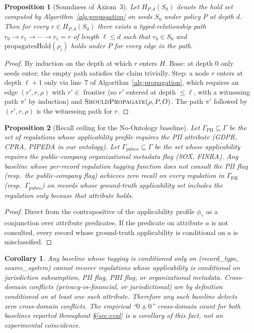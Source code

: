 \documentclass{ieeeaccess}
\newtheorem{proposition}{Proposition}
\newtheorem{corollary}{Corollary}
\begin{document}
\begin{proposition}[Soundness of Axiom~3]
Let $H_{P,d}(S_0)$ denote the hold set computed by Algorithm~\ref{alg:propagation} on seeds $S_0$ under policy $P$ at depth $d$. Then for every $r \in H_{P,d}(S_0)$ there exists a typed-relationship path $r_0 \to r_1 \to \cdots \to r_\ell = r$ of length $\ell \leq d$ such that $r_0 \in S_0$ and $\mathrm{propagatesHold}(\rho_i)$ holds under $P$ for every edge in the path.
\end{proposition}

\begin{proof}
By induction on the depth at which $r$ enters $H$. Base: at depth 0 only seeds enter; the empty path satisfies the claim trivially. Step: a node $r$ enters at depth $\ell + 1$ only via line~7 of Algorithm~\ref{alg:propagation}, which requires an edge $(r', r, \rho)$ with $r' \in$ frontier (so $r'$ entered at depth $\leq \ell$, with a witnessing path $\pi'$ by induction) and $\textsc{ShouldPropagate}(\rho, P, O)$. The path $\pi'$ followed by $(r', r, \rho)$ is the witnessing path for $r$.
\end{proof}

\begin{proposition}[Recall ceiling for the No-Ontology baseline]
Let $\Gamma_{\mathrm{PII}} \subseteq \Gamma$ be the set of regulations whose applicability profile requires the PII attribute (GDPR, CPRA, PIPEDA in our ontology). Let $\Gamma_{\mathrm{pubco}} \subseteq \Gamma$ be the set whose applicability requires the public-company organizational metadata flag (SOX, FINRA). Any baseline whose per-record regulation tagging function does not consult the PII flag (resp.\ the public-company flag) achieves zero recall on every regulation in $\Gamma_{\mathrm{PII}}$ (resp.\ $\Gamma_{\mathrm{pubco}}$) on records whose ground-truth applicability set includes the regulation only because that attribute holds.
\end{proposition}

\begin{proof}
Direct from the contrapositive of the applicability profile $\phi_\gamma$ as a conjunction over attribute predicates. If the predicate on attribute $a$ is not consulted, every record whose ground-truth applicability is conditional on $a$ is misclassified.
\end{proof}

\begin{corollary}
Any baseline whose tagging is conditioned only on (record\_type, source\_system) cannot recover regulations whose applicability is conditional on jurisdiction subsumption, PII flag, PHI flag, or organizational metadata. Cross-domain conflicts (privacy-vs-financial, or jurisdictional) are by definition conditioned on at least one such attribute. Therefore any such baseline detects zero cross-domain conflicts. The empirical ``$0 \pm 0$'' cross-domain count for both baselines reported throughout §\ref{sec:eval} is a corollary of this fact, not an experimental coincidence.
\end{corollary}
\end{document}

